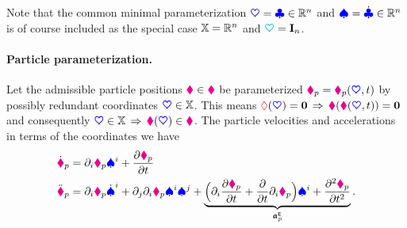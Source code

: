 Note that the common minimal parameterization $\sysCoord = \genCoord \in \RealNum^{\dimConfigSpace}$ and $\sysVel=\genCoordd \in \RealNum^{\dimConfigSpace}$ is of course included as the special case $\configSpace=\RealNum^{\dimConfigSpace}$ and $\kinMat=\idMat[\dimConfigSpace]$.

\paragraph{Particle parameterization.}
Let the admissible particle positions $\particleCoord \in \particleConfigSpace$ be parameterized $\particlePos{\PidxI} = \particlePos{\PidxI}(\sysCoord, t)$ by possibly redundant coordinates $\sysCoord \in \configSpace$.
This means $\geoConstraint(\sysCoord) = \tuple{0}\,\Rightarrow\,\particleGeoConstraint(\particleCoord(\sysCoord,t)) = \tuple{0}$ and consequently $\sysCoord \in \configSpace \, \Rightarrow \, \particleCoord(\sysCoord) \in \particleConfigSpace$.
The particle velocities and accelerations in terms of the coordinates we have 
\begin{subequations}\label{eq:particleVelAcc}
\begin{align}
 \particlePosd{\PidxI} &= \dirDiff{\LidxI}\particlePos{\PidxI} \sysVelCoeff{\LidxI} + \pdiff[\particlePos{\PidxI}]{t}
\\
 \particlePosdd{\PidxI} &= \dirDiff{\LidxI}\particlePos{\PidxI} \sysVelCoeffd{\LidxI} + \dirDiff{\LidxII}\dirDiff{\LidxI}\particlePos{\PidxI} \sysVelCoeff{\LidxI} \sysVelCoeff{\LidxII}
  + \underbrace{\Big( \dirDiff{\LidxI} \pdiff[\particlePos{\PidxI}]{t} + \pdiff{t}\dirDiff{i}\particlePos{\PidxI} \Big) \sysVelCoeff{\LidxI} + \frac{\partial^2 \particlePos{\PidxI}}{\partial t^2}}_{\particleAccTime{\PidxI}}.
\label{eq:particleAcc}
\end{align}
\end{subequations}

